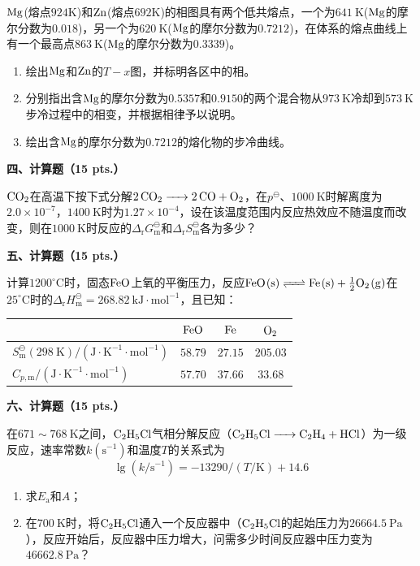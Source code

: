 $\ce{Mg}$(熔点$924\mathrm{K}$)和$\ce{Zn}$(熔点$692\mathrm{K}$)的相图具有两个低共熔点，一个为$641\ \mathrm{K}$($\ce{Mg}$的摩尔分数为$0.018$)，另一个为$620\ \mathrm{K}$($\ce{Mg}$的摩尔分数为$0.7212$)，在体系的熔点曲线上有一个最高点$863\ \mathrm{K}$($\ce{Mg}$的摩尔分数为$0.3339$)。
\begin{enumerate}[label=(\arabic*), itemsep=1ex]
    \item 绘出$\ce{Mg}$和$\ce{Zn}$的$T-x$图，并标明各区中的相。
    \item 分别指出含$\ce{Mg}$的摩尔分数为$0.5357$和$0.9150$的两个混合物从$973\ \mathrm{K}$冷却到$573\ \mathrm{K}$步冷过程中的相变，并根据相律予以说明。
    \item 绘出含$\ce{Mg}$的摩尔分数为$0.7212$的熔化物的步冷曲线。
\end{enumerate}

\vspace{0.5cm}
\noindent\textbf{四、计算题（15 pts.）}

$\ce{CO2}$在高温下按下式分解$\ce{2CO2 -> 2CO + O2}$，在$p^\ominus$、$1000\ \mathrm{K}$时解离度为$2.0\times10^{-7}$，$1400\ \mathrm{K}$时为$1.27\times10^{-4}$，设在该温度范围内反应热效应不随温度而改变，则在$1000\ \mathrm{K}$时反应的$\Delta_\mathrm{r}G_\mathrm{m}^\ominus$和$\Delta_\mathrm{r}S_\mathrm{m}^\ominus$各为多少？

\vspace{0.5cm}
\noindent\textbf{五、计算题（15 pts.）}

计算$1200^\circ\mathrm{C}$时，固态$\ce{FeO}$上氧的平衡压力，反应$\ce{FeO(s) <=> Fe(s) + \frac{1}{2}O2(g)}$在$25^\circ\mathrm{C}$时的$\Delta_\mathrm{r}H_\mathrm{m}^\ominus=268.82\ \mathrm{kJ\cdot mol^{-1}}$，且已知：

\begin{center}
\begin{tabular}{lccc}
 & $\ce{FeO}$ & $\ce{Fe}$ & $\ce{O2}$ \\
\hline
$S_\mathrm{m}^\ominus(298\ \mathrm{K})/(\mathrm{J\cdot K^{-1}\cdot mol^{-1}})$ & $58.79$ & $27.15$ & $205.03$ \\
$C_{p,\mathrm{m}}/(\mathrm{J\cdot K^{-1}\cdot mol^{-1}})$ & $57.70$ & $37.66$ & $33.68$ \\
\end{tabular}
\end{center}

\vspace{0.5cm}
\noindent\textbf{六、计算题（15 pts.）}

在$671\sim768\ \mathrm{K}$之间，$\ce{C2H5Cl}$气相分解反应（$\ce{C2H5Cl -> C2H4 + HCl}$）为一级反应，速率常数$k(\mathrm{s^{-1}})$和温度$T$的关系式为
\[
\lg(k/\mathrm{s^{-1}}) = -13290/(T/\mathrm{K}) + 14.6
\]
\begin{enumerate}[label=(\arabic*), itemsep=1ex]
    \item 求$E_\mathrm{a}$和$A$；
    \item 在$700\ \mathrm{K}$时，将$\ce{C2H5Cl}$通入一个反应器中（$\ce{C2H5Cl}$的起始压力为$26664.5\ \mathrm{Pa}$），反应开始后，反应器中压力增大，问需多少时间反应器中压力变为$46662.8\ \mathrm{Pa}$？
\end{enumerate}

